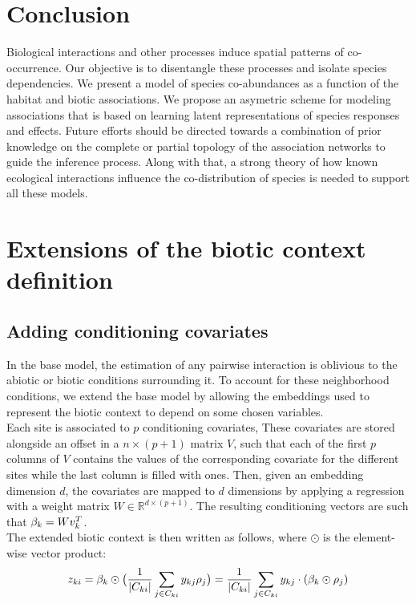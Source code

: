 \documentclass[10pt,a4paper]{article}
\begin{document}
\section{Conclusion}
Biological interactions and other processes induce spatial patterns of co-occurrence. Our objective is to disentangle these processes and isolate species dependencies. We present a model of species co-abundances as a function of the habitat and biotic associations. We propose an asymetric scheme for modeling associations that is based on learning latent representations of species responses and effects. Future efforts should be directed towards a combination of prior knowledge on the complete or partial topology of the association networks to guide the inference process. Along with that, a strong theory of how known ecological interactions influence the co-distribution of species is needed to support all these models.   

\appendix

\section{Extensions of the biotic context definition}
\label{sec:alt-bio}

\subsection{Adding conditioning covariates}
In the base model, the estimation of any pairwise interaction is oblivious to the abiotic or biotic conditions surrounding it. To account for these neighborhood conditions, we extend the base model by allowing the embeddings used to represent the biotic context to depend on some chosen variables.\\

Each site is associated to $p$ conditioning covariates, These covariates are stored alongside an offset in a $n \times (p+1)$ matrix $V$, such that each of the first $p$ columns of $V$ contains the values of the corresponding covariate for the different sites while the last column is filled with ones. 
Then, given an embedding dimension $d$, the covariates are mapped to $d$ dimensions by applying a regression with a weight matrix $W \in \mathbb{R}^{d \times (p+1)}$. The resulting conditioning vectors are such that $\beta_k = Wv^{T}_{k}$.\\

The extended biotic context is then written as follows, where $\odot$ is the element-wise vector product: 
\begin{equation*}
  z_{ki} = \beta_{k} \odot \big(\frac{1}{\left\lvert C_{ki}\right\rvert} \sum_{j \in C_{ki}} y_{kj} \rho_{j} \big)
  = \frac{1}{\left\lvert C_{ki}\right\rvert} \sum_{j \in C_{ki}} y_{kj} \cdot (\beta_{k} \odot \rho_{j}) 
\end{equation*}
\end{document}
